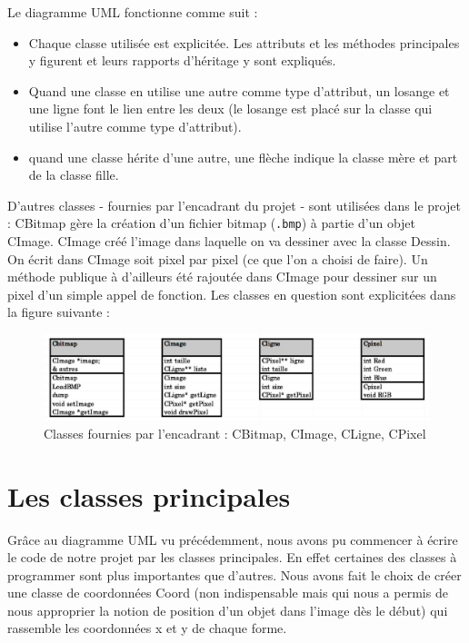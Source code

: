 \documentclass[11pt]{article}
\begin{document}
Le diagramme UML fonctionne comme suit : 
\begin{itemize}
    \item Chaque classe utilisée est explicitée. Les attributs et les méthodes principales y figurent et leurs rapports d'héritage y sont expliqués. 
    \item Quand une classe en utilise une autre comme type d'attribut, un losange et une ligne font le lien entre les deux (le losange est placé sur la classe qui utilise l'autre comme type d'attribut).
    \item quand une classe hérite d'une autre, une flèche indique la classe mère et part de la classe fille. \\
\end{itemize}

D'autres classes - fournies par l'encadrant du projet - sont utilisées dans le projet : CBitmap gère la création d'un fichier bitmap (\texttt{.bmp}) à partie d'un objet CImage. CImage créé l'image dans laquelle on va dessiner avec la classe Dessin. On écrit dans CImage soit pixel par pixel (ce que l'on a choisi de faire). Un méthode publique à d’ailleurs été rajoutée dans CImage pour dessiner sur un pixel d'un simple appel de fonction. Les classes en question sont explicitées dans la figure suivante : 

\begin{figure}[!htbp]
    \begin{center}
        \includegraphics[width = 12cm]{UML2.jpg}
        \caption{Classes fournies par l'encadrant : CBitmap, CImage, CLigne, CPixel}
    \end{center}
\end{figure}


\section{Les classes principales}

Grâce au diagramme UML vu précédemment, nous avons pu commencer à écrire le code de notre projet par les classes principales. En effet certaines des classes à programmer sont plus importantes que d'autres. Nous avons fait le choix de créer une classe de coordonnées Coord (non indispensable mais qui nous a permis de nous approprier la notion de position d'un objet dans l'image dès le début) qui rassemble les coordonnées x et y de chaque forme. \\
\end{document}
